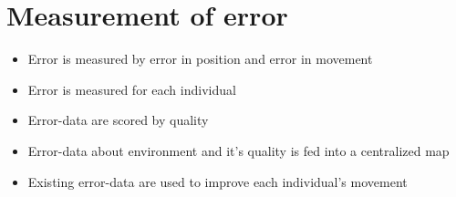 \section{Measurement of error}
\begin{itemize}
	\item{Error is measured by error in position and error in movement}
	\item{Error is measured for each individual}
	\item{Error-data are scored by quality}
	\item{Error-data about environment and it's quality is fed into a centralized map}
	\item{Existing error-data are used to improve each individual's movement}
\end{itemize}